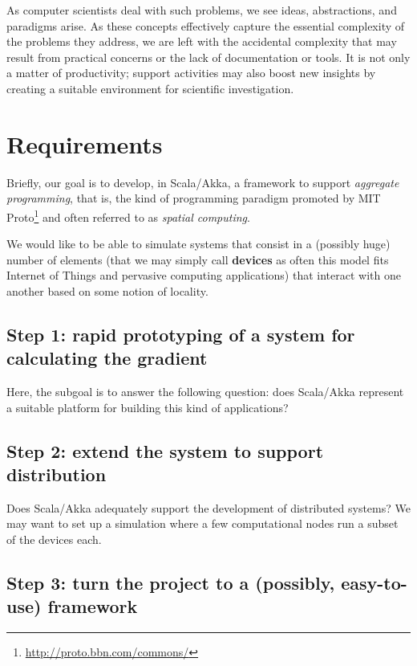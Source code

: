 \documentclass[11pt]{llncs}
\begin{document}
As computer scientists deal with such problems, we see ideas, abstractions, and paradigms arise. As these concepts effectively capture the essential complexity of the problems they address, we are left with the accidental complexity that may result from practical concerns or the lack of documentation or tools. It is not only a matter of productivity; support activities may also boost new insights by creating a suitable environment for scientific investigation.

\newpage

\section{Requirements}

Briefly, our goal is to develop, in Scala/Akka, a framework to support \emph{aggregate programming}, that is, the kind of programming paradigm promoted by MIT Proto\footnote{\url{http://proto.bbn.com/commons/}} and often referred to as \emph{spatial computing}. 

We would like to be able to simulate systems that consist in a (possibly huge) number of elements (that we may simply call \textbf{devices} as often this model fits Internet of Things and pervasive computing applications) that interact with one another based on some notion of locality.

\subsection*{Step 1: rapid prototyping of a system for calculating the gradient}

Here, the subgoal is to answer the following question: does Scala/Akka represent a suitable platform for building this kind of applications?

\subsection*{Step 2: extend the system to support distribution}

Does Scala/Akka adequately support the development of distributed systems? We may want to set up a simulation where a few computational nodes run a subset of the devices each.

\subsection*{Step 3: turn the project to a (possibly, easy-to-use) framework}
\end{document}
